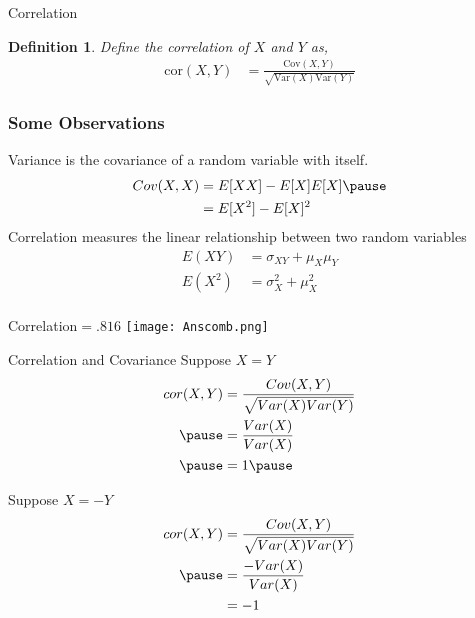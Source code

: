 \documentclass[aspectratio=169, handout]{beamer}
\newtheorem{defn}{Definition}
\numberwithin{equation}{section}
\begin{document}
\begin{frame}{Correlation}
\begin{defn} 
Define the correlation of $X$ and $Y$ as,  \pause 
\begin{align*}
\text{cor}(X,Y) & =  \frac{\text{Cov}(X,Y) }{\sqrt{\text{Var}(X) \text{Var}(Y) } }
\end{align*}
\end{defn} 
\end{frame}


\begin{frame}
\frametitle{Some Observations}

Variance is the covariance of a random variable with itself.\pause 
\begin{align*}
Cov(X,X) & =  E[X X] - E[X]E[X] \pause \\
& =  E[X^2] - E[X]^2
\end{align*}
\pause 
Correlation measures the linear relationship between two random variables\\ 

\begin{align*}
E(XY) & =  \sigma_{XY}+\mu_X\mu_Y  \\
E(X^2) & =  \sigma^2_{X}+\mu^2_X  \\
\end{align*}

\end{frame}


\begin{frame}{Correlation$=.816$}
\texttt{[image: Anscomb.png]}
\end{frame}


\begin{frame}{Correlation and Covariance}
Suppose $X = Y$ \pause 
\begin{align*}
cor(X,Y) &= \frac{Cov(X,Y)}{\sqrt{Var(X)Var(Y)} }  \\ \pause 
&= \frac{Var(X)}{Var(X)}  \\ \pause 
&= 1   \pause 
\end{align*}

Suppose $X = -Y$  \pause 
\begin{align*}
cor(X,Y) &= \frac{Cov(X,Y)}{\sqrt{Var(X)Var(Y)} } \\ \pause 
& =   \frac{- Var(X)}{Var(X)}  \\
& =   -1
\end{align*}

\end{frame}
\end{document}

